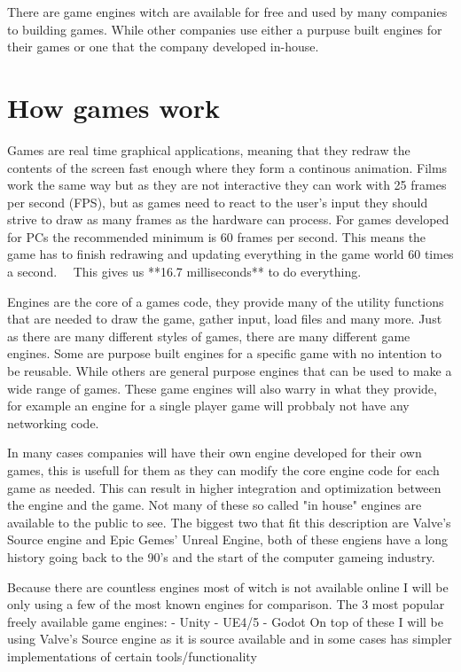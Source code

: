 There are game engines witch are available for free and used by many companies to building games. While other companies use either a purpuse built engines for their games or one that the company developed in-house.


\section{How games work}
Games are real time graphical applications, meaning that they redraw the contents of the screen fast enough where they form a continous animation. Films work the same way but as they are not interactive they can work with 25 frames per second (FPS), but as games need to react to the user's input they should strive to draw as many frames as the hardware can process. For games developed for PCs the recommended minimum is 60 frames per second. This means the game has to finish redrawing and updating everything in the game world 60 times a second. ~~This gives us **16.7 milliseconds** to do everything.~~

Engines are the core of a games code, they provide many of the utility functions that are needed to draw the game, gather input, load files and many more. Just as there are many different styles of games, there are many different game engines. Some are purpose built engines for a specific game with no intention to be reusable. While others are general purpose engines that can be used to make a wide range of games. These game engines will also warry in what they provide, for example an engine for a single player game will probbaly not have any networking code.

In many cases companies will have their own engine developed for their own games, this is usefull for them as they can modify the core engine code for each game as needed. This can result in higher integration and optimization between the engine and the game. Not many of these so called "in house" engines are available to the public to see. The biggest two that fit this description are Valve's Source engine and Epic Gemes' Unreal Engine, both of these engiens have a long history going back to the 90's and the start of the computer gameing industry.

Because there are countless engines most of witch is not available online I will be only using a few of the most known engines for comparison.
The 3 most popular freely available game engines:
- Unity
- UE4/5
- Godot
On top of these I will be using Valve's Source engine as it is source available and in some cases has simpler implementations of certain tools/functionality

